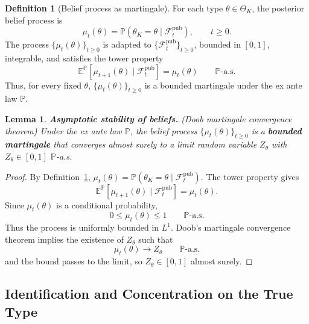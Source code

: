 \documentclass[12pt,a4paper]{article}
\theoremstyle{plain}
\newtheorem{lemma}[theorem]{Lemma}
\theoremstyle{definition}
\newtheorem{definition}[theorem]{Definition}
\theoremstyle{remark}
\newcommand{\ProbE}{\mathbb{P}}
\newcommand{\E}{\mathbb{E}}
\newcommand{\1}{\mathbf{1}}
\begin{document}
\begin{definition}[Belief process as martingale]
\label{def:beliefs-martingale}
For each type $\theta\in\Theta_K$, the posterior belief process is
\begin{equation}
\label{eq:beliefs-ebp-consistency}
\mu_t(\theta)
=\ProbE\!\left(\theta_K=\theta\mid\mathcal{F}_t^{\mathrm{pub}}\right),
\qquad t\ge0.
\end{equation}
The process $\{\mu_t(\theta)\}_{t\ge0}$ is adapted to
$\{\mathcal{F}_t^{\mathrm{pub}}\}_{t\ge0}$, bounded in $[0,1]$, integrable, and satisfies
the tower property
\[
\E^{\ProbE}\!\left[\mu_{t+1}(\theta)\mid\mathcal{F}_t^{\mathrm{pub}}\right]
=\mu_t(\theta)
\qquad \ProbE\text{-a.s.}
\]
Thus, for every fixed $\theta$, $\{\mu_t(\theta)\}_{t\ge0}$ is a bounded martingale
under the ex ante law $\ProbE$.
\end{definition}

\begin{lemma}{\textbf{Asymptotic stability of beliefs.} \textnormal{(Doob martingale convergence theorem)}}
\label{lem:asymptotic-beliefs}
Under the ex ante law $\ProbE$, the belief process $\{\mu_t(\theta)\}_{t\ge0}$ is a
\textbf{bounded martingale} that converges almost surely to a limit random variable
$Z_\theta$ with $Z_\theta\in[0,1]$ $\ProbE$-a.s.
\end{lemma}

\begin{proof}
By Definition~\ref{def:beliefs-martingale},
$\mu_t(\theta)=\ProbE(\theta_K=\theta\mid\mathcal{F}_t^{\mathrm{pub}})$. The tower
property gives
\begin{equation}
\label{eq:lem74-tower}
\E^{\ProbE}\!\left[\mu_{t+1}(\theta)\mid\mathcal{F}_t^{\mathrm{pub}}\right]
=\mu_t(\theta).
\end{equation}
Since $\mu_t(\theta)$ is a conditional probability,
\begin{equation}
\label{eq:lem74-pointwise-bound}
0\le \mu_t(\theta)\le1\qquad \ProbE\text{-a.s.}
\end{equation}
Thus the process is uniformly bounded in $L^1$. Doob's martingale convergence theorem
implies the existence of $Z_\theta$ such that
\begin{equation}
\label{eq:lem74-as-limit}
\mu_t(\theta)\longrightarrow Z_\theta
\qquad \ProbE\text{-a.s.}
\end{equation}
and the bound passes to the limit, so $Z_\theta\in[0,1]$ almost surely.
\end{proof}

\subsection{Identification and Concentration on the True Type}
\label{subsec:identificacion-concentracion-tipo}
\end{document}
